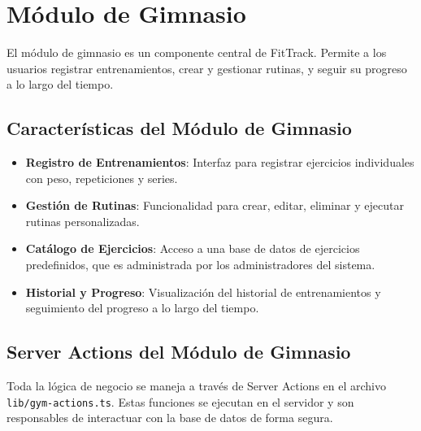 \documentclass[12pt,a4paper]{article}
\begin{document}
\section{Módulo de Gimnasio}

El módulo de gimnasio es un componente central de FitTrack. Permite a los usuarios registrar entrenamientos, crear y gestionar rutinas, y seguir su progreso a lo largo del tiempo.

\subsection{Características del Módulo de Gimnasio}
\begin{itemize}
    \item \textbf{Registro de Entrenamientos}: Interfaz para registrar ejercicios individuales con peso, repeticiones y series.
    \item \textbf{Gestión de Rutinas}: Funcionalidad para crear, editar, eliminar y ejecutar rutinas personalizadas.
    \item \textbf{Catálogo de Ejercicios}: Acceso a una base de datos de ejercicios predefinidos, que es administrada por los administradores del sistema.
    \item \textbf{Historial y Progreso}: Visualización del historial de entrenamientos y seguimiento del progreso a lo largo del tiempo.
\end{itemize}

\subsection{Server Actions del Módulo de Gimnasio}

Toda la lógica de negocio se maneja a través de Server Actions en el archivo \texttt{lib/gym-actions.ts}. Estas funciones se ejecutan en el servidor y son responsables de interactuar con la base de datos de forma segura.
\end{document}
